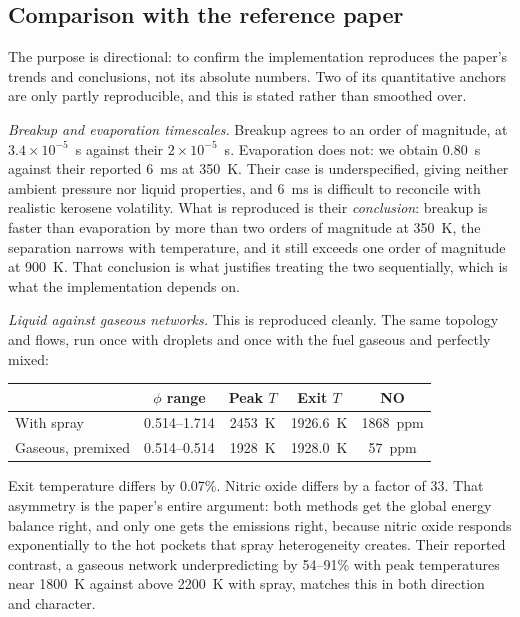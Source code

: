 \documentclass[11pt]{article}
\begin{document}
\subsection{Comparison with the reference paper}

The purpose is directional: to confirm the implementation reproduces the paper's trends
and conclusions, not its absolute numbers. Two of its quantitative anchors are only
partly reproducible, and this is stated rather than smoothed over.

\emph{Breakup and evaporation timescales.} Breakup agrees to an order of magnitude, at
$3.4\times10^{-5}$~s against their $2\times10^{-5}$~s. Evaporation does not: we obtain
0.80~s against their reported 6~ms at 350~K. Their case is underspecified, giving neither
ambient pressure nor liquid properties, and 6~ms is difficult to reconcile with realistic
kerosene volatility. What is reproduced is their \emph{conclusion}: breakup is faster than
evaporation by more than two orders of magnitude at 350~K, the separation narrows with
temperature, and it still exceeds one order of magnitude at 900~K. That conclusion is what
justifies treating the two sequentially, which is what the implementation depends on.

\emph{Liquid against gaseous networks.} This is reproduced cleanly. The same topology and
flows, run once with droplets and once with the fuel gaseous and perfectly mixed:

\begin{center}
\begin{tabular}{lcccc}
\toprule
 & $\phi$ range & Peak $T$ & Exit $T$ & NO \\
\midrule
With spray & 0.514--1.714 & 2453~K & 1926.6~K & 1868~ppm \\
Gaseous, premixed & 0.514--0.514 & 1928~K & 1928.0~K & 57~ppm \\
\bottomrule
\end{tabular}
\end{center}

Exit temperature differs by 0.07\%. Nitric oxide differs by a factor of 33. That asymmetry
is the paper's entire argument: both methods get the global energy balance right, and only
one gets the emissions right, because nitric oxide responds exponentially to the hot
pockets that spray heterogeneity creates. Their reported contrast, a gaseous network
underpredicting by 54--91\% with peak temperatures near 1800~K against above 2200~K with
spray, matches this in both direction and character.
\end{document}
